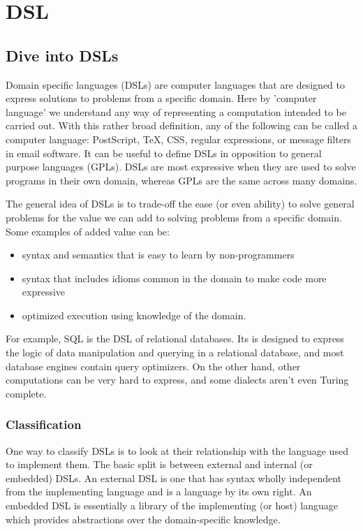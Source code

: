 \chapter{DSL}


\section{Dive into DSLs}

Domain specific languages (DSLs) are computer languages that are designed to express solutions to problems from a specific domain. Here by 'computer language' we understand any way of representing a computation intended to be carried out. With this rather broad definition, any of the following can be called a computer language: PostScript, TeX, CSS, regular expressions, or message filters in email software. It can be useful to define DSLs in opposition to general purpose languages (GPLs). DSLs are most expressive when they are used to solve programs in their own domain, whereas GPLs are the same across many domains.

The general idea of DSLs is to trade-off the ease (or even ability) to solve general problems for the value we can add to solving problems from a specific domain. Some examples of added value can be:
\begin{itemize}
	\item syntax and semantics that is easy to learn by non-programmers
	\item syntax that includes idioms common in the domain to make code more expressive
	\item optimized execution using knowledge of the domain.
\end{itemize}

 For example, SQL is the DSL of relational databases. Its is designed to express the logic of data manipulation and querying in a relational database, and most database engines contain query optimizers. On the other hand, other computations can be very hard to express, and some dialects aren't even Turing complete.


\subsection{Classification}
One way to classify DSLs is to look at their relationship with the language used to implement them. The basic split is between external and internal (or embedded) DSLs. An external DSL is one that has syntax wholly independent from the implementing language and is a language by its own right. An embedded DSL is essentially a library of the implementing (or host) language which provides abstractions over the domain-specific knowledge.

